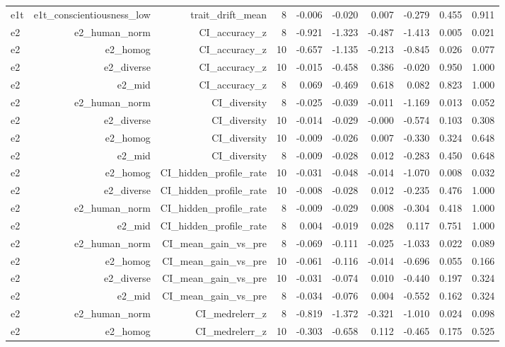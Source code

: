 \documentclass[11pt]{article}
\begin{document}
\begin{landscape}
\begin{longtable}{@{}lrrrrrrrrr@{}}
e1t & e1t\_conscientiousness\_low & trait\_drift\_mean & 8 & -0.006 & -0.020 & 0.007 & -0.279 & 0.455 & 0.911 \\
e2 & e2\_human\_norm & CI\_accuracy\_z & 8 & -0.921 & -1.323 & -0.487 & -1.413 & 0.005 & 0.021 \\
e2 & e2\_homog & CI\_accuracy\_z & 10 & -0.657 & -1.135 & -0.213 & -0.845 & 0.026 & 0.077 \\
e2 & e2\_diverse & CI\_accuracy\_z & 10 & -0.015 & -0.458 & 0.386 & -0.020 & 0.950 & 1.000 \\
e2 & e2\_mid & CI\_accuracy\_z & 8 & 0.069 & -0.469 & 0.618 & 0.082 & 0.823 & 1.000 \\
e2 & e2\_human\_norm & CI\_diversity & 8 & -0.025 & -0.039 & -0.011 & -1.169 & 0.013 & 0.052 \\
e2 & e2\_diverse & CI\_diversity & 10 & -0.014 & -0.029 & -0.000 & -0.574 & 0.103 & 0.308 \\
e2 & e2\_homog & CI\_diversity & 10 & -0.009 & -0.026 & 0.007 & -0.330 & 0.324 & 0.648 \\
e2 & e2\_mid & CI\_diversity & 8 & -0.009 & -0.028 & 0.012 & -0.283 & 0.450 & 0.648 \\
e2 & e2\_homog & CI\_hidden\_profile\_rate & 10 & -0.031 & -0.048 & -0.014 & -1.070 & 0.008 & 0.032 \\
e2 & e2\_diverse & CI\_hidden\_profile\_rate & 10 & -0.008 & -0.028 & 0.012 & -0.235 & 0.476 & 1.000 \\
e2 & e2\_human\_norm & CI\_hidden\_profile\_rate & 8 & -0.009 & -0.029 & 0.008 & -0.304 & 0.418 & 1.000 \\
e2 & e2\_mid & CI\_hidden\_profile\_rate & 8 & 0.004 & -0.019 & 0.028 & 0.117 & 0.751 & 1.000 \\
e2 & e2\_human\_norm & CI\_mean\_gain\_vs\_pre & 8 & -0.069 & -0.111 & -0.025 & -1.033 & 0.022 & 0.089 \\
e2 & e2\_homog & CI\_mean\_gain\_vs\_pre & 10 & -0.061 & -0.116 & -0.014 & -0.696 & 0.055 & 0.166 \\
e2 & e2\_diverse & CI\_mean\_gain\_vs\_pre & 10 & -0.031 & -0.074 & 0.010 & -0.440 & 0.197 & 0.324 \\
e2 & e2\_mid & CI\_mean\_gain\_vs\_pre & 8 & -0.034 & -0.076 & 0.004 & -0.552 & 0.162 & 0.324 \\
e2 & e2\_human\_norm & CI\_medrelerr\_z & 8 & -0.819 & -1.372 & -0.321 & -1.010 & 0.024 & 0.098 \\
e2 & e2\_homog & CI\_medrelerr\_z & 10 & -0.303 & -0.658 & 0.112 & -0.465 & 0.175 & 0.525 \\

\end{longtable}
\end{landscape}
\end{document}
